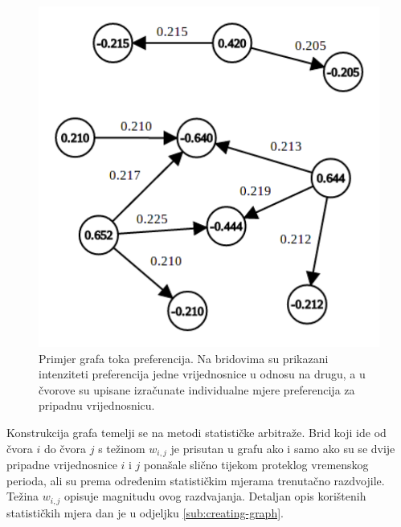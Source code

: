 \documentclass[lmodern, utf8, diplomski, numeric]{fer}
\begin{document}
  \begin{figure}[h]
    \centering
    \includegraphics[width=0.6\columnwidth]{graphics/graph.pdf}
    \caption{Primjer grafa toka preferencija. Na bridovima su prikazani intenziteti preferencija jedne vrijednosnice u odnosu na drugu, a u čvorove su upisane izračunate individualne mjere preferencija za pripadnu vrijednosnicu.}
    \label{fig:graph}
  \end{figure}
  
  Konstrukcija grafa temelji se na metodi statističke arbitraže.
  Brid koji ide od čvora $i$ do čvora $j$ s težinom $w_{i,j}$ je prisutan u grafu ako i samo ako su se dvije pripadne vrijednosnice $i$ i $j$ ponašale slično tijekom proteklog vremenskog perioda, ali su prema određenim statističkim mjerama trenutačno razdvojile.
  Težina $w_{i,j}$ opisuje magnitudu ovog razdvajanja.
  Detaljan opis korištenih statističkih mjera dan je u odjeljku \ref{sub:creating-graph}.
    
\end{document}
